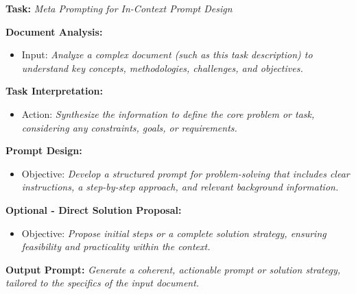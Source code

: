 \begin{tcolorbox}[width=\textwidth,colback=gray!2!white,colframe=gray!50!blue]
    \textbf{Task:} \textit{Meta Prompting for In-Context Prompt Design}

    \textbf{Document Analysis:}
    \begin{itemize}
        \item Input: \textit{Analyze a complex document (such as this task description) to understand key concepts, methodologies, challenges, and objectives.}
    \end{itemize}

    \textbf{Task Interpretation:}
    \begin{itemize}
        \item Action: \textit{Synthesize the information to define the core problem or task, considering any constraints, goals, or requirements.}
    \end{itemize}

    \textbf{Prompt Design:}
    \begin{itemize}
        \item Objective: \textit{Develop a structured prompt for problem-solving that includes clear instructions, a step-by-step approach, and relevant background information.}
    \end{itemize}

    \textbf{Optional - Direct Solution Proposal:}
    \begin{itemize}
        \item Objective: \textit{Propose initial steps or a complete solution strategy, ensuring feasibility and practicality within the context.}
    \end{itemize}

    \textbf{Output Prompt:} \textit{Generate a coherent, actionable prompt or solution strategy, tailored to the specifics of the input document.}
\end{tcolorbox}

